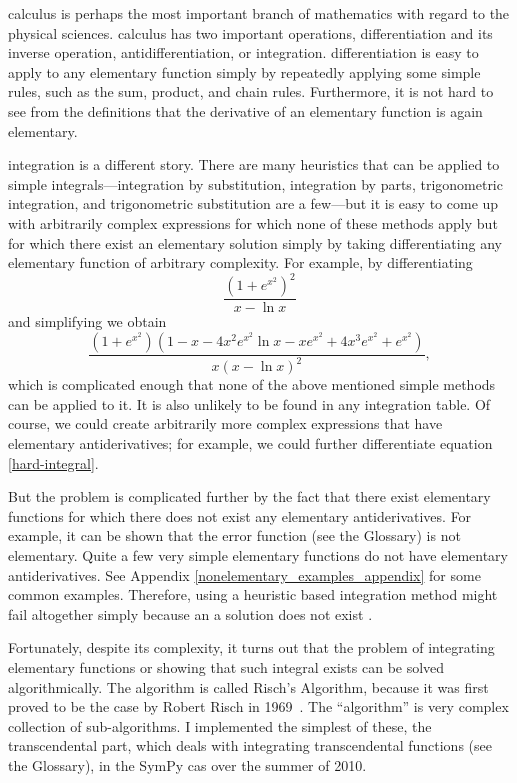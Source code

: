 \Gls{calculus} is perhaps the most important branch of mathematics with
regard to the physical sciences.  \Gls{calculus} has two important
operations, \gls{differentiation} and its inverse operation,
antidifferentiation, or \gls{integration}.  \Gls{differentiation} is
easy to apply to any \gls{elementary} function simply by repeatedly
applying some simple rules, such as the sum, product, and chain rules.
Furthermore, it is not hard to see from the definitions that the
derivative of an \gls{elementary} function is again \gls{elementary}.

\Gls{integration} is a different story.  There are many heuristics that
can be applied to simple integrals---\gls{integration} by substitution,
\gls{integration} by parts, trigonometric \gls{integration}, and
trigonometric substitution are a few---but it is easy to come up with
arbitrarily complex expressions for which none of these methods apply
but for which there exist an \gls{elementary} solution simply by taking
differentiating any elementary function of arbitrary complexity.  For
example, by differentiating
\begin{equation}
\label{hard-integral-sol}
    \frac{\left(1 + e^{x^{2}}\right)^{2}}{x - \ln{x}}
\end{equation}
and simplifying we obtain
\begin{equation}
\label{hard-integral}
    \frac{\left(1 + e^{x^{2}}\right) \left(1 - x - 4 x^{2} e^{x^{2}}
    \ln{x} - x e^{x^{2}} + 4 x^{3} e^{x^{2}} +
    e^{x^{2}}\right)}{x \left(x -
    \ln{x}\right)^{2}},
\end{equation}
which is complicated enough that none of the above mentioned simple
methods can be applied to it.  It is also unlikely to be found in any
integration table.  Of course, we could create arbitrarily more complex
expressions that have elementary antiderivatives; for example, we
could further differentiate equation \ref{hard-integral}. 

But the problem is complicated further by the fact that there exist
\gls{elementary} functions for which there does not exist any
\gls{elementary} antiderivatives.  For example, it can be shown that
the \gls{error function} (see the Glossary) is not elementary.  Quite a
few very simple elementary functions do not have elementary
antiderivatives.  See Appendix \ref{nonelementary_examples_appendix}
for some common examples. Therefore, using a heuristic based
\gls{integration} method might fail altogether simply because an a
solution does not exist .

Fortunately, despite its complexity, it turns out that the problem of
integrating elementary functions or showing that such integral exists
can be solved algorithmically.  The algorithm is called Risch's
Algorithm, because it was first proved to be the case by Robert Risch in
1969~\cite{risch1969problem}.  The ``algorithm'' is very complex
collection of sub-algorithms.  I implemented the simplest of these, the
\gls{transcendental} part, which deals with integrating
\gls{transcendental} functions (see the Glossary), in the SymPy
\gls{cas} over the summer of 2010.
